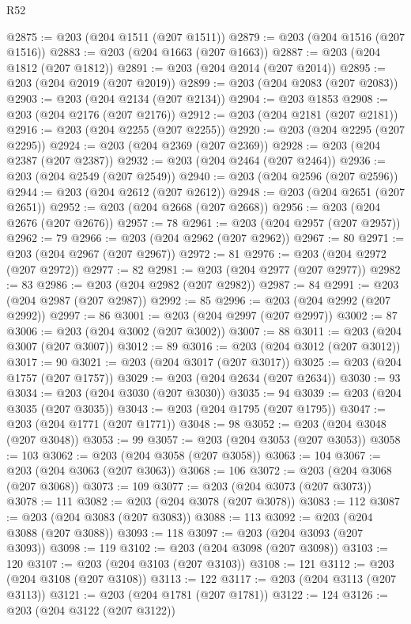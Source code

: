 \begin{lexlean}{R52}
\begin{coremodule}
@2875 := @203 (@204 @1511 (@207 @1511))
@2879 := @203 (@204 @1516 (@207 @1516))
@2883 := @203 (@204 @1663 (@207 @1663))
@2887 := @203 (@204 @1812 (@207 @1812))
@2891 := @203 (@204 @2014 (@207 @2014))
@2895 := @203 (@204 @2019 (@207 @2019))
@2899 := @203 (@204 @2083 (@207 @2083))
@2903 := @203 (@204 @2134 (@207 @2134))
@2904 := @203 @1853
@2908 := @203 (@204 @2176 (@207 @2176))
@2912 := @203 (@204 @2181 (@207 @2181))
@2916 := @203 (@204 @2255 (@207 @2255))
@2920 := @203 (@204 @2295 (@207 @2295))
@2924 := @203 (@204 @2369 (@207 @2369))
@2928 := @203 (@204 @2387 (@207 @2387))
@2932 := @203 (@204 @2464 (@207 @2464))
@2936 := @203 (@204 @2549 (@207 @2549))
@2940 := @203 (@204 @2596 (@207 @2596))
@2944 := @203 (@204 @2612 (@207 @2612))
@2948 := @203 (@204 @2651 (@207 @2651))
@2952 := @203 (@204 @2668 (@207 @2668))
@2956 := @203 (@204 @2676 (@207 @2676))
@2957 := 78
@2961 := @203 (@204 @2957 (@207 @2957))
@2962 := 79
@2966 := @203 (@204 @2962 (@207 @2962))
@2967 := 80
@2971 := @203 (@204 @2967 (@207 @2967))
@2972 := 81
@2976 := @203 (@204 @2972 (@207 @2972))
@2977 := 82
@2981 := @203 (@204 @2977 (@207 @2977))
@2982 := 83
@2986 := @203 (@204 @2982 (@207 @2982))
@2987 := 84
@2991 := @203 (@204 @2987 (@207 @2987))
@2992 := 85
@2996 := @203 (@204 @2992 (@207 @2992))
@2997 := 86
@3001 := @203 (@204 @2997 (@207 @2997))
@3002 := 87
@3006 := @203 (@204 @3002 (@207 @3002))
@3007 := 88
@3011 := @203 (@204 @3007 (@207 @3007))
@3012 := 89
@3016 := @203 (@204 @3012 (@207 @3012))
@3017 := 90
@3021 := @203 (@204 @3017 (@207 @3017))
@3025 := @203 (@204 @1757 (@207 @1757))
@3029 := @203 (@204 @2634 (@207 @2634))
@3030 := 93
@3034 := @203 (@204 @3030 (@207 @3030))
@3035 := 94
@3039 := @203 (@204 @3035 (@207 @3035))
@3043 := @203 (@204 @1795 (@207 @1795))
@3047 := @203 (@204 @1771 (@207 @1771))
@3048 := 98
@3052 := @203 (@204 @3048 (@207 @3048))
@3053 := 99
@3057 := @203 (@204 @3053 (@207 @3053))
@3058 := 103
@3062 := @203 (@204 @3058 (@207 @3058))
@3063 := 104
@3067 := @203 (@204 @3063 (@207 @3063))
@3068 := 106
@3072 := @203 (@204 @3068 (@207 @3068))
@3073 := 109
@3077 := @203 (@204 @3073 (@207 @3073))
@3078 := 111
@3082 := @203 (@204 @3078 (@207 @3078))
@3083 := 112
@3087 := @203 (@204 @3083 (@207 @3083))
@3088 := 113
@3092 := @203 (@204 @3088 (@207 @3088))
@3093 := 118
@3097 := @203 (@204 @3093 (@207 @3093))
@3098 := 119
@3102 := @203 (@204 @3098 (@207 @3098))
@3103 := 120
@3107 := @203 (@204 @3103 (@207 @3103))
@3108 := 121
@3112 := @203 (@204 @3108 (@207 @3108))
@3113 := 122
@3117 := @203 (@204 @3113 (@207 @3113))
@3121 := @203 (@204 @1781 (@207 @1781))
@3122 := 124
@3126 := @203 (@204 @3122 (@207 @3122))

\end{coremodule}
\end{lexlean}
